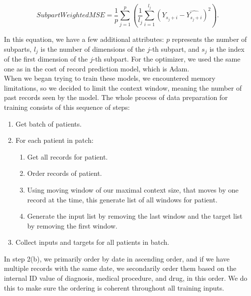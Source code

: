 \begin{equation}
	\label{eqn:swmse}
	SubpartWeightedMSE = \frac{1}{p} \sum_{j=1}^{p}(\frac{1}{l_j}\sum_{i=1}^{l_j}(Y_{s_j+i}-\hat{Y_{s_j+i}})^2).
\end{equation} 

In this equation, we have a few additional attributes: $p$ represents the number of subparts, $l_j$ is the number of dimensions of the $j$-th subpart, and $s_j$ is the index of the first dimension of the $j$-th subpart. For the optimizer, we used the same one as in the cost of record prediction model, which is Adam.
\\

When we began trying to train these models, we encountered memory limitations, so we decided to limit the context window, meaning the number of past records seen by the model. The whole process of data preparation for training consists of this sequence of steps:

\begin{enumerate}
	\item Get batch of patients.
	\item For each patient in patch:
	\begin{enumerate}
		\item Get all records for patient.
		\item Order records of patient.
		\item Using moving window of our maximal context size, that moves by one record at the time, this generate list of all windows for patient.
		\item Generate the input list by removing the last window and the target list by removing the first window.
	\end{enumerate}
	\item Collect inputs and targets for all patients in batch.
\end{enumerate}

In step 2(b), we primarily order by date in ascending order, and if we have multiple records with the same date, we secondarily order them based on the internal ID value of diagnosis, medical procedure, and drug, in this order. We do this to make sure the ordering is coherent throughout all training inputs.
\\ 


